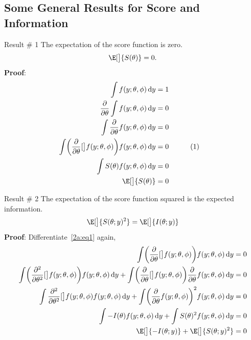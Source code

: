 \documentclass{article}\usepackage[]{graphicx}\usepackage[svgnames]{xcolor}
\let\log\relax%
\begin{document}
\subsection*{Some General Results for Score and Information}
\begin{Result}{Result \# 1}
    The expectation of the score function is zero.
    \[ \E[\big]{S(\theta)}=0. \]
    \tcblower{}
    \textbf{Proof}:
    \begin{align*}
        \int f(y;\theta,\phi)\odif{y}                                                         & =1                               \\
        \pdv*{\int f(y;\theta,\phi)\odif{y}}{\theta}                                          & =0                               \\
        \int\pdv*{f(y;\theta,\phi)}{\theta} \odif{y}                                          & =0                               \\
        \int\biggl(\pdv*{\log[\big]{f(y;\theta,\phi)}}{\theta}\biggr)f(y;\theta,\phi)\odif{y} & =0 &  & \label{2a:eq1}\tag*{(1)} \\
        \int S(\theta)f(y;\theta,\phi)\odif{y}                                                & =0                               \\
        \E[\big]{S(\theta)}                                                                   & =0
    \end{align*}
\end{Result}
\begin{Result}{Result \# 2}
    The expectation of the score function squared is the expected information.
    \[  \E[\big]{S(\theta;y)^2}=\E[\big]{I(\theta;y)} \]
    \tcblower{}
    \textbf{Proof}: Differentiate~\ref{2a:eq1} again,
    \begin{align*}
        \int\biggl(\pdv*{\log[\big]{f(y;\theta,\phi)}}{\theta}\biggr)f(y;\theta,\phi)\odif{y}                                                                                                                & =0 \\
        \int \biggl(\pdv*[order=2]{\log[\big]{f(y;\theta,\phi)}}{\theta}\biggr)f(y;\theta,\phi)\odif{y}+\int\biggl(\pdv*{\log[\big]{f(y;\theta,\phi)}}{\theta}\biggr)\pdv*{f(y;\theta,\phi)}{\theta}\odif{y} & =0 \\
        \int \pdv*[order=2]{\log[\big]{f(y;\theta,\phi)}}{\theta}f(y;\theta,\phi)\odif{y}+\int\biggl(\pdv*{f(y;\theta,\phi)}{\theta}\biggr)^2 f(y;\theta,\phi)\odif{y}                                       & =0 \\
        \int -I(\theta)f(y;\theta,\phi)\odif{y}+\int S(\theta)^2 f(y;\theta,\phi)\odif{y}                                                                                                                    & =0 \\
        \E[\big]{-I(\theta;y)}+\E[\big]{S(\theta;y)^2}                                                                                                                                                       & =0
    \end{align*}
\end{Result}
\end{document}
